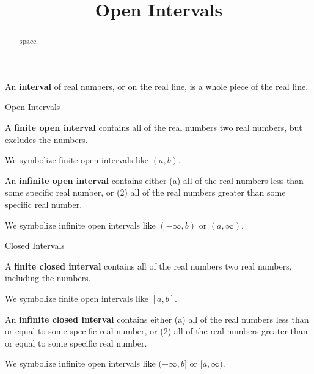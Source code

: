 \documentclass{ximera}
\title{Open Intervals}
\begin{document}
\begin{abstract}
space
\end{abstract}
\maketitle




An \textbf{interval} of real numbers, or on the real line, is a whole piece of the real line.


\begin{definition}  Open Intervals

\item A \textbf{finite open interval} contains all of the real numbers two real numbers, but excludes the numbers.

We symbolize finite open intervals like $(a, b)$.



\item An \textbf{infinite open interval} contains either (a) all of the real numbers less than some specific real number, or (2) all of the real numbers greater than some specific real number.

We symbolize infinite open intervals like $(-\infty, b)$ or $(a, \infty)$.

\end{definition}










\begin{definition}  Closed Intervals

\item A \textbf{finite closed interval} contains all of the real numbers two real numbers, including the numbers.

We symbolize finite open intervals like $[a, b]$.




\item An \textbf{infinite closed interval} contains either (a) all of the real numbers less than or equal to some specific real number, or (2) all of the real numbers greater than or equal to some specific real number.

We symbolize infinite open intervals like $(-\infty, b]$ or $[a, \infty)$.

\end{definition}
\end{document}
